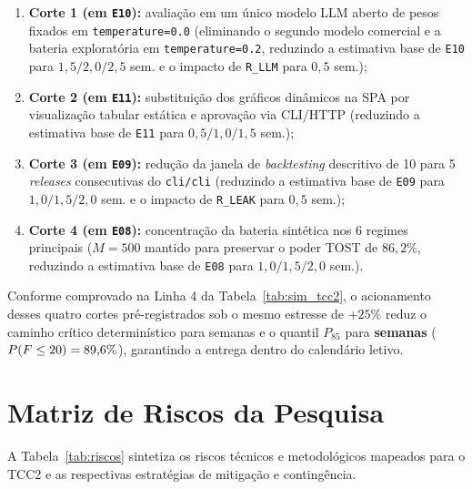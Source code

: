 \documentclass[12pt,openany,oneside,a4paper,english,brazilian,sumario=tradicional]{abntex2}
\begin{document}
\begin{enumerate}
  \begin{enumerate}
    \item \textbf{Corte 1 (em \texttt{E10}):} avaliação em um único modelo LLM aberto de pesos fixados em \texttt{temperature=0.0} (eliminando o segundo modelo comercial e a bateria exploratória em \texttt{temperature=0.2}, reduzindo a estimativa base de \texttt{E10} para $1{,}5/2{,}0/2{,}5$ sem. e o impacto de \texttt{R\_LLM} para $0{,}5$ sem.);
    \item \textbf{Corte 2 (em \texttt{E11}):} substituição dos gráficos dinâmicos na SPA por visualização tabular estática e aprovação via CLI/HTTP (reduzindo a estimativa base de \texttt{E11} para $0{,}5/1{,}0/1{,}5$ sem.);
    \item \textbf{Corte 3 (em \texttt{E09}):} redução da janela de \textit{backtesting} descritivo de 10 para 5 \textit{releases} consecutivas do \texttt{cli/cli} (reduzindo a estimativa base de \texttt{E09} para $1{,}0/1{,}5/2{,}0$ sem. e o impacto de \texttt{R\_LEAK} para $0{,}5$ sem.);
    \item \textbf{Corte 4 (em \texttt{E08}):} concentração da bateria sintética nos 6 regimes principais ($M=500$ mantido para preservar o poder TOST de $86{,}2\%$, reduzindo a estimativa base de \texttt{E08} para $1{,}0/1{,}5/2{,}0$ sem.).
  \end{enumerate}
  Conforme comprovado na Linha 4 da Tabela~\ref{tab:sim_tcc2}, o acionamento desses quatro cortes pré-registrados sob o mesmo estresse de $+25\%$ reduz o caminho crítico determinístico para \tccDoisCutsCPM{} semanas e o quantil $P_{85}$ para \textbf{\tccDoisCutsPoitentaeCinco{} semanas} ($P(F \le 20) = 89{,}6{}\%$), garantindo a entrega dentro do calendário letivo.
\end{enumerate}

\section{Matriz de Riscos da Pesquisa}

A Tabela~\ref{tab:riscos} sintetiza os riscos técnicos e metodológicos mapeados para o TCC2 e as respectivas estratégias de mitigação e contingência.
\end{document}
